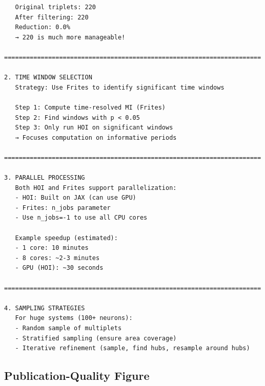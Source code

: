 \documentclass[
  11pt,
  letterpaper,
  oneside,
  openany]{book}
\begin{document}
\begin{verbatim}
   Original triplets: 220
   After filtering: 220
   Reduction: 0.0%
   → 220 is much more manageable!

======================================================================

2. TIME WINDOW SELECTION
   Strategy: Use Frites to identify significant time windows

   Step 1: Compute time-resolved MI (Frites)
   Step 2: Find windows with p < 0.05
   Step 3: Only run HOI on significant windows
   → Focuses computation on informative periods

======================================================================

3. PARALLEL PROCESSING
   Both HOI and Frites support parallelization:
   - HOI: Built on JAX (can use GPU)
   - Frites: n_jobs parameter
   - Use n_jobs=-1 to use all CPU cores

   Example speedup (estimated):
   - 1 core: 10 minutes
   - 8 cores: ~2-3 minutes
   - GPU (HOI): ~30 seconds

======================================================================

4. SAMPLING STRATEGIES
   For huge systems (100+ neurons):
   - Random sample of multiplets
   - Stratified sampling (ensure area coverage)
   - Iterative refinement (sample, find hubs, resample around hubs)
\end{verbatim}

\subsection{Publication-Quality
Figure}\label{publication-quality-figure}
\end{document}
